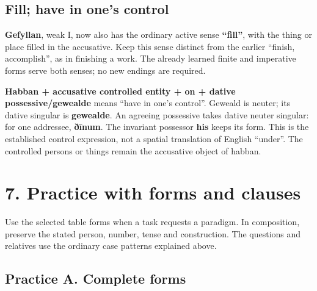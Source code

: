 \subsection*{Fill; have in one’s control}

\textbf{Gefyllan}, weak I, now also has the ordinary active sense \textbf{“fill”}, with the thing or place filled in the accusative. Keep this sense distinct from the earlier “finish, accomplish”, as in finishing a work. The already learned finite and imperative forms serve both senses; no new endings are required.

\textbf{Habban + accusative controlled entity + on + dative possessive/\allowbreak{}gewealde} means “have in one’s control”. Geweald is neuter; its dative singular is \textbf{gewealde}. An agreeing possessive takes dative neuter singular: for one addressee, \textbf{ðīnum}. The invariant possessor \textbf{his} keeps its form. This is the established control expression, not a spatial translation of English “under”. The controlled persons or things remain the accusative object of habban.

\section*{7. Practice with forms and clauses}

Use the selected table forms when a task requests a paradigm. In composition, preserve the stated person, number, tense and construction. The questions and relatives use the ordinary case patterns explained above.

\subsection*{Practice A. Complete forms}

